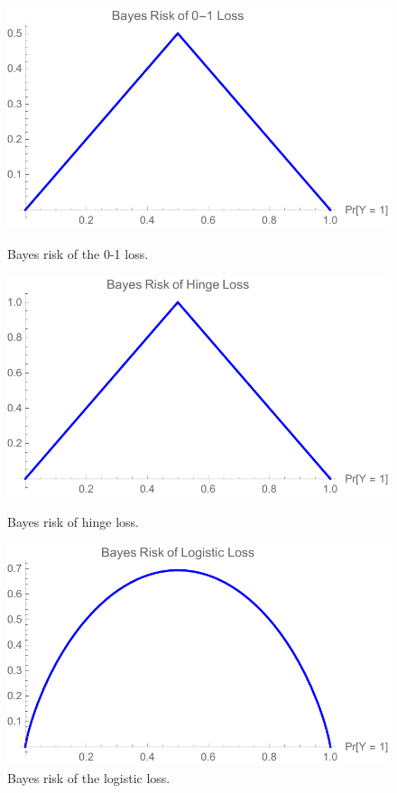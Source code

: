 \documentclass[12pt]{article}
\begin{document}
\begin{figure}
	\begin{minipage}{0.3\linewidth}
		\centering
		\includegraphics[width=0.9\linewidth]{figs/0-1-br.pdf}
		\caption{Bayes risk of the 0-1 loss.}
		\label{fig:0-1-br}
	\end{minipage}
	\hfill
	\begin{minipage}{0.3\linewidth}
		\centering
		\includegraphics[width=0.9\linewidth]{figs/hinge-br.pdf}
		\caption{Bayes risk of hinge loss.}
		\label{fig:hinge-br}
	\end{minipage}
	\hfill
	\begin{minipage}{0.3\linewidth}
	\centering
	\includegraphics[width=0.9\linewidth]{figs/logistic-br.pdf}
	\caption{Bayes risk of the logistic loss.}
	\label{fig:logistic-br}
\end{minipage}
\end{figure}
\end{document}
